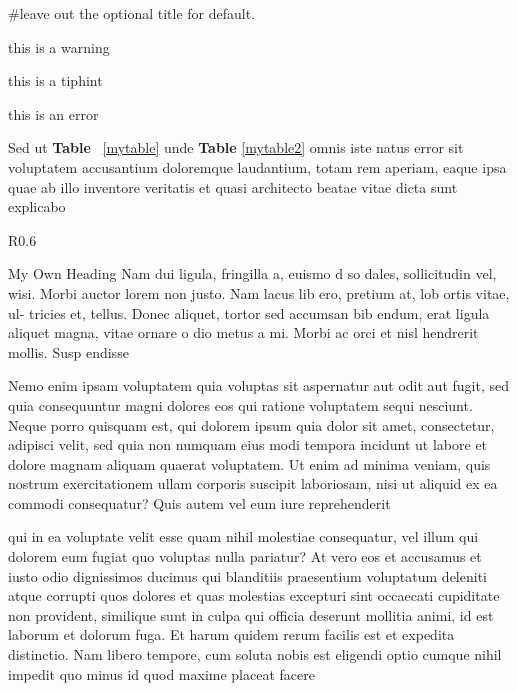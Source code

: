 \documentclass[12pt,a4paper]{report}
\begin{document}
\begin{warning}
\begin{literal}
  #leave out the optional title for default.
\end{literal}
this is a warning
\end{warning}
\begin{tip}{this is a tiphint}\end{tip}
\begin{error}this is an error\end{error}

Sed ut \textbf{Table} ~\ref{mytable} unde \textbf{Table} \ref{mytable2} omnis iste natus error sit voluptatem accusantium doloremque laudantium, totam rem aperiam, eaque ipsa quae ab illo inventore veritatis et quasi architecto beatae vitae dicta sunt explicabo
%
\begin{wrapfigure}{R}{0.6\textwidth}
	\begin{sidebar}{My Own Heading}
		Nam dui ligula, fringilla a, euismo d so dales, sollicitudin vel, wisi. Morbi auctor lorem non justo. Nam lacus lib ero, pretium at, lob ortis vitae, ul- tricies et, tellus. Donec aliquet, tortor sed accumsan bib endum, erat ligula aliquet magna, vitae ornare o dio metus a mi. Morbi ac orci et nisl hendrerit mollis. Susp endisse
	\end{sidebar}
\end{wrapfigure}
%
Nemo enim ipsam voluptatem quia voluptas sit aspernatur aut odit aut fugit, sed quia consequuntur magni dolores eos qui ratione voluptatem sequi nesciunt. Neque porro quisquam est, qui dolorem ipsum quia dolor sit amet, consectetur, adipisci velit, sed quia non numquam eius modi tempora incidunt ut labore et dolore magnam aliquam quaerat voluptatem. Ut enim ad minima veniam, quis nostrum exercitationem ullam corporis suscipit laboriosam, nisi ut aliquid ex ea commodi consequatur? Quis autem vel eum iure reprehenderit 

qui in ea voluptate velit esse quam nihil molestiae consequatur, vel illum qui dolorem eum fugiat quo voluptas nulla pariatur? At vero eos et accusamus et iusto odio dignissimos ducimus qui blanditiis praesentium voluptatum deleniti atque corrupti quos dolores et quas molestias excepturi sint occaecati cupiditate non provident, similique sunt in culpa qui officia deserunt mollitia animi, id est laborum et dolorum fuga. Et harum quidem rerum facilis est et expedita distinctio. Nam libero tempore, cum soluta nobis est eligendi optio cumque nihil impedit quo minus id quod maxime placeat facere
%
\end{document}
